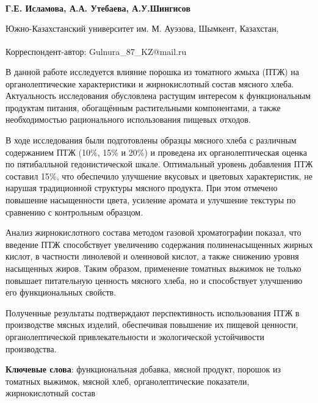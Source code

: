 
\begin{articleheader}

{\bfseries
Г.Е. Исламова\textsuperscript{\envelope },
А.А. Утебаева,
А.У.Шингисов
}
\end{articleheader}

\begin{affiliation}
Южно-Казахстанский университет им. М. Ауэзова, Шымкент, Казахстан,

\raggedright \textsuperscript{\envelope }Корреспондент-автор: Gulnura\_87\_KZ@mail.ru
\end{affiliation}

В данной работе исследуется влияние порошка из томатного жмыха (ПТЖ) на
органолептические характеристики и жирнокислотный состав мясного хлеба.
Актуальность исследования обусловлена растущим интересом к
функциональным продуктам питания, обогащённым растительными
компонентами, а также необходимостью рационального использования пищевых
отходов.

В ходе исследования были подготовлены образцы мясного хлеба с различным
содержанием ПТЖ (10\%, 15\% и 20\%) и проведена их органолептическая
оценка по пятибалльной гедонистической шкале. Оптимальный уровень
добавления ПТЖ составил 15\%, что обеспечило улучшение вкусовых и
цветовых характеристик, не нарушая традиционной структуры мясного
продукта. При этом отмечено повышение насыщенности цвета, усиление
аромата и улучшение текстуры по сравнению с контрольным образцом.

Анализ жирнокислотного состава методом газовой хроматографии показал,
что введение ПТЖ способствует увеличению содержания полиненасыщенных
жирных кислот, в частности линолевой и олеиновой кислот, а также
снижению уровня насыщенных жиров. Таким образом, применение томатных
выжимок не только повышает питательную ценность мясного хлеба, но и
способствует улучшению его функциональных свойств.

Полученные результаты подтверждают перспективность использования ПТЖ в
производстве мясных изделий, обеспечивая повышение их пищевой ценности,
органолептической привлекательности и экологической устойчивости
производства.

{\bfseries Ключевые слова}: функциональная добавка, мясной продукт, порошок
из томатных выжимок, мясной хлеб, органолептические показатели,
жирнокислотный состав


